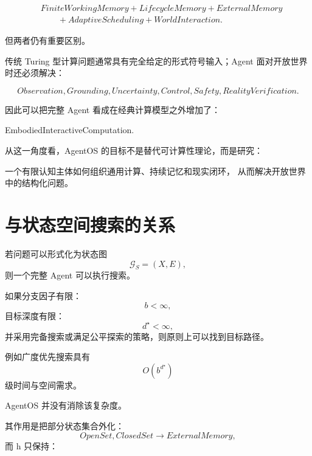 \begin{equation}
\begin{aligned}
&FiniteWorkingMemory + LifecycleMemory + ExternalMemory \\
&\qquad + AdaptiveScheduling + WorldInteraction.
\end{aligned}
\end{equation}

但两者仍有重要区别。

传统 Turing 型计算问题通常具有完全给定的形式符号输入；Agent 面对开放世界时还必须解决：

\begin{equation}
Observation,
Grounding,
Uncertainty,
Control,
Safety,
RealityVerification.
\end{equation}

因此可以把完整 Agent 看成在经典计算模型之外增加了：

\begin{statementbox}
EmbodiedInteractiveComputation.
\end{statementbox}

从这一角度看，AgentOS 的目标不是替代可计算性理论，而是研究：

\begin{statementbox}
一个有限认知主体如何组织通用计算、持续记忆和现实闭环，
从而解决开放世界中的结构化问题。
\end{statementbox}

\section{与状态空间搜索的关系}

若问题可以形式化为状态图
\begin{equation}
\mathcal G_S=(X,E),
\end{equation}
则一个完整 Agent 可以执行搜索。

如果分支因子有限：
\begin{equation}
b<\infty,
\end{equation}
目标深度有限：
\begin{equation}
d^\star<\infty,
\end{equation}
并采用完备搜索或满足公平探索的策略，则原则上可以找到目标路径。

例如广度优先搜索具有
\begin{equation}
O(b^{d^\star})
\end{equation}
级时间与空间需求。

AgentOS 并没有消除该复杂度。

其作用是把部分状态集合外化：
\begin{equation}
OpenSet,
ClosedSet
\rightarrow
ExternalMemory,
\end{equation}
而 h 只保持：

